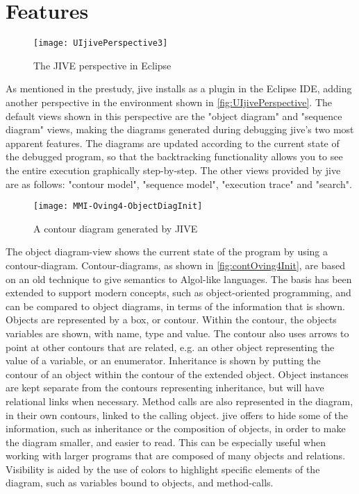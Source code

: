 \section{Features}\label{jiveFeatures}

\begin{figure}[H]
	\centering
	\texttt{[image: UIjivePerspective3]}
	\caption{The JIVE perspective in Eclipse}
	\label{fig:UIjivePerspective}
\end{figure}
As mentioned in the prestudy, \gls{jive} installs as a plugin in the Eclipse IDE, adding another perspective in the environment shown in \autoref{fig:UIjivePerspective}.
The default views shown in this perspective are the "object diagram" and "sequence diagram" views, making the diagrams generated during debugging \gls{jive}'s two most apparent features.
The diagrams are updated according to the current state of the debugged program, so that the backtracking functionality allows you to see the entire execution graphically step-by-step.
The other views provided by \gls{jive} are as follows: "contour model", "sequence model", "execution trace" and "search".


\begin{figure}[H]
	\centering
	\texttt{[image: MMI-Oving4-ObjectDiagInit]}
	\caption{A contour diagram generated by JIVE}
	\label{fig:contOving4Init}
\end{figure}
The object diagram-view shows the current state of the program by using a contour-diagram.
Contour-diagrams, as shown in \autoref{fig:contOving4Init}, are based on an old technique to give semantics to Algol-like languages.
The basis has been extended to support modern concepts, such as object-oriented programming, and can be compared to object diagrams, in terms of the information that is shown.
Objects are represented by a box, or contour.
Within the contour, the objects variables are shown, with name, type and value.
The contour also uses arrows to point at other contours that are related, e.g. an other object representing the value of a variable, or an enumerator.
Inheritance is shown by putting the contour of an object within the contour of the extended object. 
Object instances are kept separate from the contours representing inheritance, but will have relational links when necessary.
Method calls are also represented in the diagram, in their own contours, linked to the calling object.
\gls{jive} offers to hide some of the information, such as inheritance or the composition of objects, in order to make the diagram smaller, and easier to read.
This can be especially useful when working with larger programs that are composed of many objects and relations.
Visibility is aided by the use of colors to highlight specific elements of the diagram, such as variables bound to objects, and method-calls.


